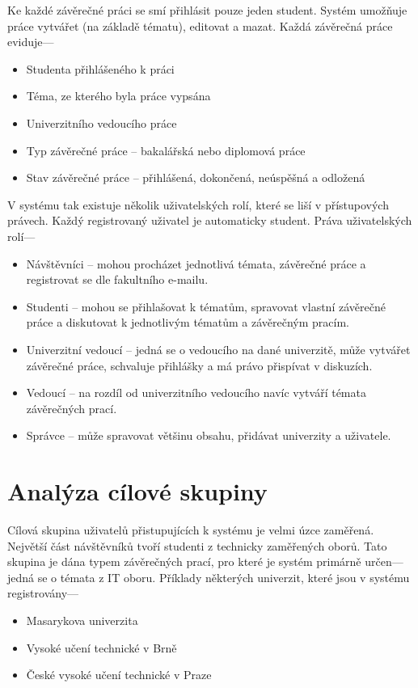 Ke každé závěrečné práci se smí přihlásit pouze jeden student. Systém umožňuje práce vytvářet (na základě tématu), editovat a mazat. Každá závěrečná práce eviduje---

\begin{itemize}
    \item Studenta přihlášeného k práci
    \item Téma, ze kterého byla práce vypsána
    \item Univerzitního vedoucího práce
    \item Typ závěrečné práce -- bakalářská nebo diplomová práce
    \item Stav závěrečné práce -- přihlášená, dokončená, neúspěšná a odložená
\end{itemize}

V systému tak existuje několik uživatelských rolí, které se liší v přístupových právech. Každý registrovaný uživatel je automaticky student. Práva uživatelských rolí---

\begin{itemize}
    \item Návštěvníci -- mohou procházet jednotlivá témata, závěrečné práce a registrovat se dle fakultního e-mailu.
    \item Studenti -- mohou se přihlašovat k tématům, spravovat vlastní závěrečné práce a diskutovat k jednotlivým tématům a závěrečným pracím.
    \item Univerzitní vedoucí -- jedná se o vedoucího na dané univerzitě, může vytvářet závěrečné práce, schvaluje přihlášky a má právo přispívat v diskuzích.
    \item Vedoucí -- na rozdíl od univerzitního vedoucího navíc vytváří témata závěrečných prací.
    \item Správce -- může spravovat většinu obsahu, přidávat univerzity a uživatele.
\end{itemize}

\section{Analýza cílové skupiny}

Cílová skupina uživatelů přistupujících k systému je velmi úzce zaměřená. Největší část návštěvníků tvoří studenti z technicky zaměřených oborů. Tato skupina je dána typem závěrečných prací, pro které je systém primárně určen---jedná se o témata z IT oboru. Příklady některých univerzit, které jsou v systému registrovány---

\begin{itemize}
    \item Masarykova univerzita
    \item Vysoké učení technické v Brně
    \item České vysoké učení technické v Praze
\end{itemize}

